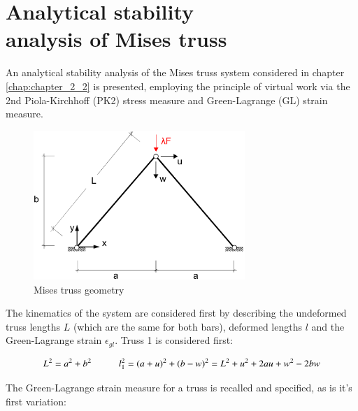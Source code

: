 
\chapter[Analytical stability analysis of Mises truss]{Analytical stability\\ analysis of Mises truss}
\label{app:Analytical stability analysis of Mises truss}

An analytical stability analysis of the Mises truss system considered in chapter \ref{chap:chapter_2_2} is presented, employing the principle of virtual work via the 2nd Piola-Kirchhoff (PK2) stress measure and Green-Lagrange (GL) strain measure.

\begin{figure}[H]
	\centering
	\def\svgwidth{\columnwidth}
	\includegraphics[width=8cm]{images/mises_truss_def.png}
	\caption{Mises truss geometry}
	\label{pic:app0}
\end{figure}

The kinematics of the system are considered first by describing the undeformed truss lengths $L$ (which are the same for both bars), deformed lengths $l$ and the Green-Lagrange strain $\epsilon_{gl}$. Truss 1 is considered first:

\begin{equation} 
L^2 = a^2 + b^2
\hspace{10mm}
l_1^2 = (a+u)^2 + (b-w)^2 = L^2 + u^2 + 2au +w^2 -2bw
\label{eqapp0_1}
\end{equation}

The Green-Lagrange strain measure for a truss is recalled and specified, as is it's first variation:

